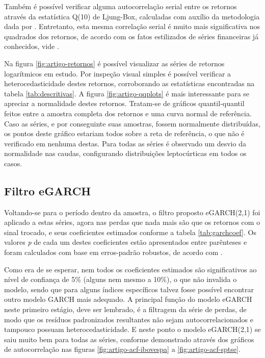 \documentclass[1p]{elsarticle}
\theoremstyle{definition}
\begin{document}
Também é possível verificar alguma autocorrelação serial entre os retornos através da estatística Q(10) de Ljung-Box, calculadas com auxílio da metodologia dada por \cite{Fisher2012}. Entretanto, esta mesma correlação serial é muito mais significativa nos quadrados dos retornos, de acordo com os fatos estilizados de séries financeiras já conhecidos, vide \cite{Cont2001}.



Na figura \ref{fig:artigo-retornos} é possível visualizar as séries de retornos logarítmicos em estudo. Por inspeção visual simples é possível verificar a heterocedasticidade destes retornos, corroborando as estatísticas encontradas na tabela \ref{tab:descritivas}. A figura \ref{fig:artigo-qqplots} é mais interessante para se apreciar a normalidade destes retornos. Tratam-se de gráficos quantil-quantil feitos entre a amostra completa dos retornos e uma curva normal de referência. Caso as séries, e por conseguinte suas amostras, fossem normalmente distribuídas, os pontos deste gráfico estariam todos sobre a reta de referência, o que não é verificado em nenhuma destas. Para todas as séries é observado um desvio da normalidade nas caudas, configurando distribuições leptocúrticas em todos os casos.

\subsection{Filtro eGARCH}
\label{sec:filtro}

Voltando-se para o período dentro da amostra, o filtro proposto eGARCH(2,1) foi aplicado a estas séries, agora nas perdas que nada mais são que os retornos com o sinal trocado, e seus coeficientes estimados conforme a tabela \ref{tab:garchcoef}. Os valores \emph{p} de cada um destes coeficientes estão apresentados entre parênteses e foram calculados com base em erros-padrão robustos, de acordo com \cite{White1982}.

Como era de se esperar, nem todos os coeficientes estimados são significativos ao nível de confiança de 5\% (alguns nem mesmo a 10\%), o que não invalida o modelo, sendo que para alguns índices específicos talvez fosse possível encontrar outro modelo GARCH mais adequado. A principal função do modelo eGARCH neste primeiro estágio, deve ser lembrado, é a filtragem da série de perdas, de modo que os resíduos padronizados resultantes não sejam autocorrelacionados e tampouco possuam heterocedasticidade. E neste ponto o modelo eGARCH(2,1) se saiu muito bem para todas as séries, conforme demonstrado através dos gráficos de autocorrelação nas figuras \ref{fig:artigo-acf-ibovespa} a \ref{fig:artigo-acf-sptse}.
\end{document}
